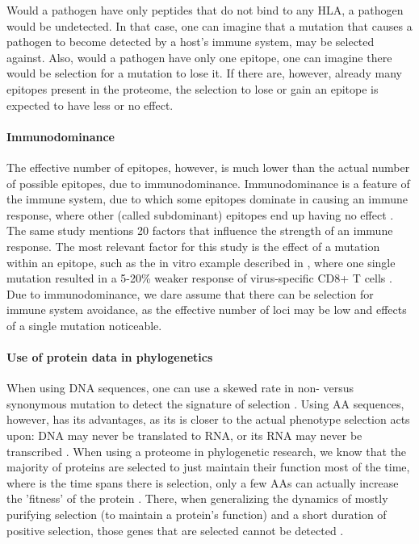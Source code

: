 Would a pathogen have only peptides that do not bind to
any HLA, a pathogen would be undetected. In that case, one
can imagine that a mutation
that causes a pathogen to become detected by a host's immune
system, may be selected against. Also, would a pathogen have only
one epitope, one can imagine there would be selection for a mutation to lose it.
If there are, however, already many epitopes present in the
proteome, the selection to lose or gain an epitope is expected 
to have less or no effect.

\paragraph{Immunodominance}

The effective number of epitopes, however,
is much lower than the actual number of possible
epitopes, due to immunodominance. 
Immunodominance is a feature of the immune system,
due to which some epitopes dominate in causing an immune response,
where other (called subdominant) epitopes end up having no 
effect \cite{akram2012immunodominance}.
The same study mentions 20 factors that influence the strength
of an immune response.
The most relevant factor for this study is the effect of
a mutation within an epitope, 
such as the in vitro example described in \cite{berkhoff2004mutation},
where one single mutation resulted in a 5-20\% weaker
response of virus-specific CD8+ T cells .
Due to immunodominance, we dare assume that there can be selection
for immune system avoidance, as the effective number of loci may be
low and effects of a single mutation noticeable.

\paragraph{Use of protein data in phylogenetics}

When using DNA sequences, one can use a skewed rate 
in non- versus synonymous mutation
to detect the signature of selection \cite{murrell2015gene}.
Using AA sequences, however, has its advantages,
as its is closer to the actual phenotype
selection acts upon: DNA may never be translated to RNA,
or its RNA may never be transcribed \cite{diz2012proteomics}
.
When using a proteome in phylogenetic research,
we know that the majority of proteins are selected to just 
maintain their function most of the time, where
is the time spans there is selection, only a few AAs
can actually increase the 'fitness' of the 
protein \cite{anisimova2009investigating}.
There, when generalizing the dynamics of mostly purifying selection (to maintain
a protein's function) and a short duration of positive selection,
those genes that are selected cannot be detected \cite{yang2000statistical}.

